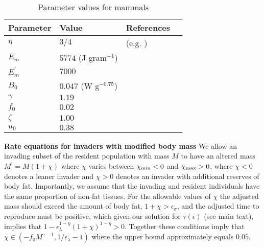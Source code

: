 \documentclass[twocolumn,preprintnumbers,amsmath,amssymb,superscriptaddress]{revtex4}
\begin{document}


 \begin{table}[h]
\caption{Parameter values for mammals}
\label{param}
    \begin{center}
    \small
     \begin{tabular}{ p{1.2cm} p{3.2cm} l p{2.2cm}|}
     \hline
     Parameter & Value & References  \\
     \hline
   $\eta$ & $3/4$  &  (e.g. \citep{West:2001bv,moses2008rmo,hou}) \\
   $E_{m}$ & $5774$ (J gram$^{-1}$)  &  \citep{moses2008rmo,West:2001bv,hou} \\
   $E_{m}^{\prime}$ & $7000$  & \citep{stryer,hou} \\
   $B_{0}$ & $0.047$ (W g$^{-0.75}$)    & \citep{hou}  \\
   $\gamma$ & $1.19$ & \citep{Lindstedt:1985hm} \\
   $f_{0}$ & $0.02$ & \citep{Lindstedt:1985hm}\\
   $\zeta$ & $1.00$  & \citep{Lindstedt:2002td} \\
   $u_{0}$ & $0.38$  & \citep{Lindstedt:2002td} \\

   \hline
    \end{tabular}
    \end{center}
   \end{table}


{\bf Rate equations for invaders with modified body mass}
We allow an invading subset of the resident population with mass $M$ to have an altered mass $M^\prime = M(1+\chi)$ where $\chi$ varies between $\chi_{\rm min} <0$ and $\chi_{\rm max}>0$, where $\chi<0$ denotes a leaner invader and $\chi > 0$ denotes an invader with additional reserves of body fat.
Importantly, we assume that the invading and resident individuals have the same proportion of non-fat tissues.
For the allowable values of $\chi$ the adjusted mass should exceed the amount of body fat, $1+\chi>\epsilon_{\sigma}$, and the adjusted time to reproduce must be positive, which given our solution for $\tau(\epsilon)$ (see main text), implies that $1-\epsilon_{\lambda}^{1-\eta}\left(1+\chi\right)^{1-\eta}>0$.
Together these conditions imply that  $\chi\in(-f_0M^{\gamma-1},1/\epsilon_{\lambda}-1)$ where the upper bound approximately equals $0.05$.
\end{document}
